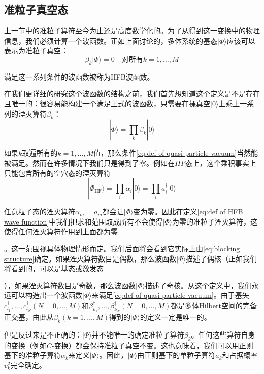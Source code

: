 \subsection{准粒子真空态}

上一节中的准粒子算符至今为止还是高度数学化的。为了从得到这一变换中的物理信息，我们必须计算一个波函数。正如上面讨论的，多体系统的基态$|\Phi\rangle$应该可以表示为准粒子真空：
\begin{equation}
\beta_{k}|\Phi\rangle=0\quad\text{对所有}k=1,\dots,M\label{eq:def of quasi-particle vacuum}
\end{equation}

满足这一系列条件的波函数被称为HFB波函数。

在我们更详细的研究这个波函数的结构之前，我们首先想知道这个定义是不是存在且唯一的：很容易能构建一个满足上式的波函数，只需要在裸真空$|0\rangle$上乘上一系列的湮灭算符$\beta_{k}$：
\begin{equation}
|\Phi\rangle=\prod_{k}\beta_{k}|0\rangle\label{eq:def of HFB wave function}
\end{equation}

如果$k$取遍所有的$k=1,\dots,M$值，那么条件\ref{eq:def of quasi-particle vacuum}当然能被满足。然而在许多情况下我们只是得到了零。例如在$HF$态上，这个乘积事实上只能包含所有的空穴态的湮灭算符
\[
|\Phi_{\text{HF}}\rangle=\prod_{i}\alpha_{i}|0\rangle=\prod_{i}a^{\dagger}_{i}|0\rangle
\]

任意粒子态的湮灭算符$\alpha_{m}=a_{m}$都会让$|\Phi\rangle$变为零。因此在定义\ref{eq:def of HFB wave function}中我们把求和范围取成所有不会使得$|\Phi\rangle$为零的准粒子湮灭算符，这使得任何湮灭算符作用到上面都为零

。这一范围视具体物理情形而定。我们后面将会看到它实际上由\ref{eq:blocking structure}确定。如果湮灭算符数目是偶数，那么波函数$|\Phi\rangle$描述了偶核（正如我们将看到的，可以是基态或激发态

），如果湮灭算符数目是奇数，那么波函数$|\Phi\rangle$描述了奇核。从这个定义中，我们永远可以构造出一个波函数$|\Phi\rangle$来满足\ref{eq:def of quasi-particle vacuum}。由于基矢$c^{\dagger}_{l_{1}},\dots,c^{\dagger}_{l_{N}}(N=0,\dots,M)$和$\beta^{\dagger}_{k_{1}},\dots,\beta^{\dagger}_{k_{N}}(N=0,\dots,M)$都是多体Hilbert空间的完备正交基，由此从$\beta_{k}(k=1,\dots,M)$得到的$|\Phi\rangle$的定义一定是唯一的。

但是反过来是不正确的：$|\Phi\rangle$并不能唯一的确定准粒子算符$\beta_{k}$。任何这些算符自身的变换（例如$C$-变换）都会保持准粒子真空不变。这也意味着，我们可以用正则基下的准粒子算符$\alpha_{k}$来定义$|\Phi\rangle$。因此，$|\Phi\rangle$由正则基下的单粒子算符$a_{k}$和占据概率$v^{2}_{k}$完全确定。

